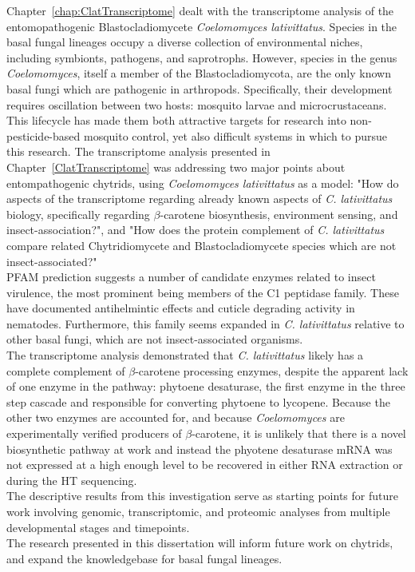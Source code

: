 \indent Chapter~\ref{chap:ClatTranscriptome} dealt with the transcriptome analysis of the entomopathogenic Blastocladiomycete \textit{Coelomomyces lativittatus}. Species in the basal fungal lineages occupy a diverse collection of environmental niches, including symbionts, pathogens, and saprotrophs. However, species in the genus \textit{Coelomomyces}, itself a member of the Blastocladiomycota, are the only known basal fungi which are pathogenic in arthropods. Specifically, their development requires oscillation between two hosts: mosquito larvae and microcrustaceans. This lifecycle has made them both attractive targets for research into non-pesticide-based mosquito control, yet also difficult systems in which to pursue this research. The transcriptome analysis presented in Chapter~\ref{ClatTranscriptome} was addressing two major points about entompathogenic chytrids, using \textit{Coelomomyces lativittatus} as a model: "How do aspects of the transcriptome regarding already known aspects of \textit{C. lativittatus} biology, specifically regarding $\beta$-carotene biosynthesis, environment sensing, and insect-association?", and "How does the protein complement of \textit{C. lativittatus} compare related Chytridiomycete and Blastocladiomycete species which are not insect-associated?"\\
\indent PFAM prediction suggests a number of candidate enzymes related to insect virulence, the most prominent being members of the C1 peptidase family. These have documented antihelmintic effects and cuticle degrading activity in nematodes. Furthermore, this family seems expanded in \textit{C. lativittatus} relative to other basal fungi, which are not insect-associated organisms.\\
\indent The transcriptome analysis demonstrated that \textit{C. lativittatus} likely has a complete complement of $\beta$-carotene processing enzymes, despite the apparent lack of one enzyme in the pathway: phytoene desaturase, the first enzyme in the three step cascade and responsible for converting phytoene to lycopene. Because the other two enzymes are accounted for, and because \textit{Coelomomyces} are experimentally verified producers of $\beta$-carotene, it is unlikely that there is a novel biosynthetic pathway at work and instead the phyotene desaturase mRNA was not expressed at a high enough level to be recovered in either RNA extraction or during the HT sequencing.\\ 
\indent The descriptive results from this investigation serve as starting points for future work involving genomic, transcriptomic, and proteomic analyses from multiple developmental stages and timepoints.\\
\indent The research presented in this dissertation will inform future work on chytrids, and expand the knowledgebase for basal fungal lineages.\\
